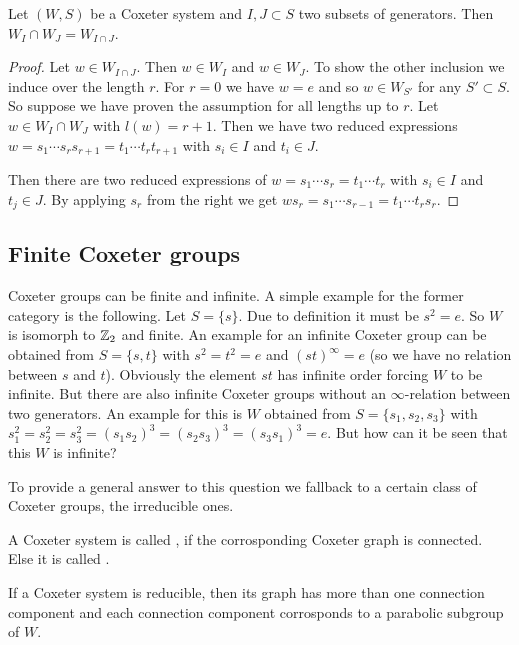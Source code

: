 \begin{lemm}
	Let $(W,S)$ be a Coxeter system and $I,J \subset S$ two subsets of generators. Then ${W_I \cap W_J} = W_{I \cap J}$.

	\begin{proof}
		Let $w \in W_{I \cap J}$. Then $w \in W_I$ and $w \in W_J$. To show the other inclusion we induce over the length $r$. For $r = 0$ we have $w = e$ and so $w \in W_{S'}$ for any $S' \subset S$. So suppose we have proven the assumption for all lengths up to $r$. Let $w \in W_I \cap W_J$ with $l(w) = r+1$. Then we have two reduced expressions $w = s_1 \cdots s_r s_{r+1} = t_1 \cdots t_r t_{r+1}$ with $s_i \in I$ and $t_i \in J$.

		Then there are two reduced expressions of $w = s_1 \cdots s_r = t_1 \cdots t_r$ with $s_i \in I$ and $t_j \in J$. By applying $s_r$ from the right we get $w s_r = s_1 \cdots s_{r-1} = t_1 \cdots t_r s_r$.
	\end{proof}
\end{lemm}

\subsection{Finite Coxeter groups}

Coxeter groups can be finite and infinite. A simple example for the former category is the following. Let $S = \{ s \}$. Due to definition it must be $s^2 = e$. So $W$ is isomorph to $\mathbb{Z}_2$ and finite. An example for an infinite Coxeter group can be obtained from $S = \{s,t\}$ with $s^2=t^2=e$ and $(st)^\infty = e$ (so we have no relation between $s$ and $t$). Obviously the element $st$ has infinite order forcing $W$ to be infinite. But there are also infinite Coxeter groups without an $\infty$-relation between two generators. An example for this is $W$ obtained from $S=\{s_1,s_2,s_3\}$ with $s_1^2=s_2^2=s_3^2=(s_1 s_2)^3=(s_2 s_3)^3=(s_3 s_1)^3=e$. But how can it be seen that this $W$ is infinite?

To provide a general answer to this question we fallback to a certain class of Coxeter groups, the irreducible ones.

\begin{defi}
	\label{irreducible-coxeter-system}
	A Coxeter system is called , if the corrosponding Coxeter graph is connected. Else it is called .
\end{defi}

If a Coxeter system is reducible, then its graph has more than one connection component and each connection component corrosponds to a parabolic subgroup of $W$. 


